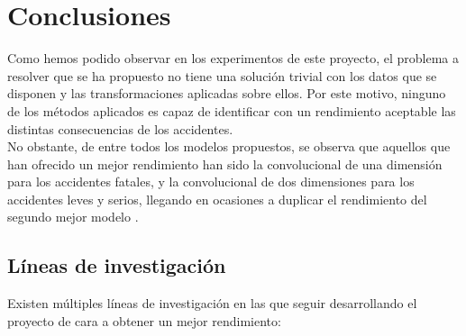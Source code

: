 
\chapter{Conclusiones}
\label{conclusiones}


Como hemos podido observar en los experimentos de este proyecto, el problema a resolver que se ha propuesto no tiene una solución trivial con los datos que se disponen y las transformaciones aplicadas sobre ellos. Por este motivo, ninguno de los métodos aplicados es capaz de identificar con un rendimiento aceptable las distintas consecuencias de los accidentes.\\

No obstante, de entre todos los modelos propuestos, se observa que aquellos que han ofrecido un mejor rendimiento han sido la convolucional de una dimensión para los accidentes fatales, y la convolucional de dos dimensiones para los accidentes leves y serios, llegando en ocasiones a duplicar el rendimiento del segundo mejor modelo .\\

\section{Líneas de investigación}


	Existen múltiples líneas de investigación en las que seguir desarrollando el proyecto de cara a obtener un mejor rendimiento:

